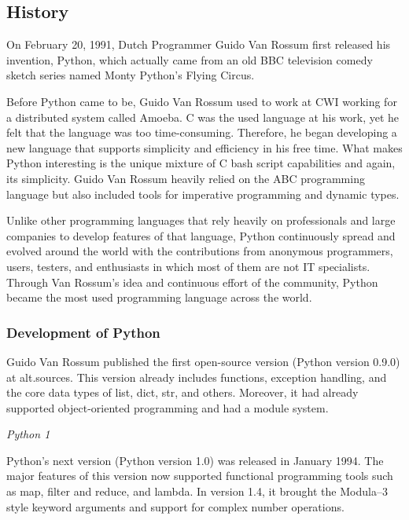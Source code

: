 \documentclass{article}
\begin{document}
\subsection*{History}
\par
On February 20, 1991, Dutch Programmer Guido Van Rossum first released his invention, Python, which actually came from an old BBC television comedy sketch series named Monty Python’s Flying Circus.
\par
Before Python came to be, Guido Van Rossum used to work at CWI working for a distributed system called Amoeba. C was the used language at his work, yet he felt that the language was too time-consuming. Therefore, he began developing a new language that supports simplicity and efficiency in his free time. What makes Python interesting is the unique mixture of C bash script capabilities and again, its simplicity. Guido Van Rossum heavily relied on the ABC programming language but also included tools for imperative programming and dynamic types.
\par
Unlike other programming languages that rely heavily on professionals and large companies to develop features of that language, Python continuously spread and evolved around the world with the contributions from anonymous programmers, users, testers, and enthusiasts in which most of them are not IT specialists. Through Van Rossum’s idea and continuous effort of the community, Python became the most used programming language across the world.

\subsubsection*{Development of Python}
\par
Guido Van Rossum published the first open-source version (Python version 0.9.0) at alt.sources. This version already includes functions, exception handling, and the core data types of list, dict, str, and others. Moreover, it had already supported object-oriented programming and had a module system.

\par
\noindent
\textit{Python 1}

\par
Python’s next version (Python version 1.0) was released in January 1994. The major features of this version now supported functional programming tools such as map, filter and reduce, and lambda. In version 1.4, it brought the Modula–3 style keyword arguments and support for complex number operations.
\end{document}
